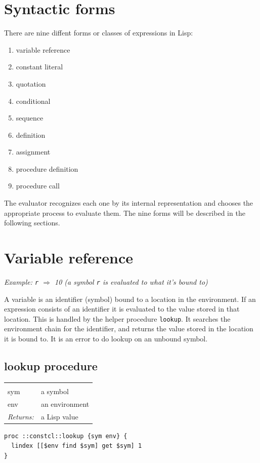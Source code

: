 \documentclass[twoside,9pt]{report}
\begin{document}
\section{Syntactic forms}
\label{syntactic-forms}


There are nine diffent forms or classes of expressions in Lisp:

\begin{enumerate}
\item  variable reference
\item  constant literal
\item  quotation
\item  conditional
\item  sequence
\item  definition
\item  assignment
\item  procedure definition
\item  procedure call
\end{enumerate}


The evaluator recognizes each one by its internal representation and chooses the appropriate process to evaluate them. The nine forms will be described in the following sections.

\section{Variable reference}
\label{variable-reference}


\emph{Example: \texttt{r} $\Rightarrow$ 10 (a symbol \texttt{r} is evaluated to what it's bound to)}


A variable is an identifier (symbol) bound to a location in the environment. If an expression consists of an identifier it is evaluated to the value stored in that location. This is handled by the helper procedure \texttt{lookup}. It searches the environment chain for the identifier, and returns the value stored in the location it is bound to. It is an error to do lookup on an unbound symbol.

\subsection{lookup procedure}
\label{lookup-procedure}
\noindent\begin{tabular}{ |p{1.9cm} p{8cm}| }
\hline
\rowcolor[HTML]{CCCCCC} \multicolumn{2}{|l|}{\bf lookup (internal)} \\
sym & a symbol \\
env & an environment \\
\textit{Returns:} & a Lisp value \\
\hline
\end{tabular}
\begin{lstlisting}
proc ::constcl::lookup {sym env} {
  lindex [[$env find $sym] get $sym] 1
}
\end{lstlisting}
\end{document}
